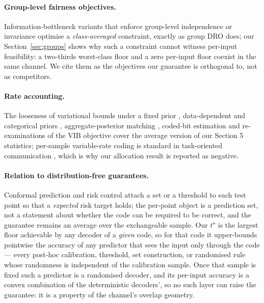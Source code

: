 \documentclass[11pt]{article}
\begin{document}
\paragraph{Group-level fairness objectives.} Information-bottleneck variants that
enforce group-level independence or invariance \citep{xie2024fairib} optimise a
\emph{class-averaged} constraint, exactly as group DRO does; our
Section~\ref{sec:groups} shows why such a constraint cannot witness per-input feasibility: a
two-thirds worst-class floor and a zero per-input floor coexist in the same channel. We cite them
as the objectives our guarantee is orthogonal to, not as competitors.

\paragraph{Rate accounting.} The looseness of variational bounds under a fixed prior
\citep{poole2019}, data-dependent and categorical priors \citep{sefidgaran2025,samaddar2022},
aggregate-posterior matching \cite{saha2023}, coded-bit estimation \citep{townsend2019}
and re-examinations of the VIB objective \citep{revisitvib} cover the average version of our
Section 5 statistics; per-sample variable-rate coding is standard in task-oriented communication
\citep{deshmukh2024,mcdowell2026,adaptq2025}, which is why our allocation result is reported as
negative.

\paragraph{Relation to distribution-free guarantees.} Conformal prediction and risk control
\citep{bates2021} attach a set or a threshold to each test point so that a \emph{expected} risk
target holds; the per-point object is a prediction set, not a statement about whether the code can
be required to be correct, and the guarantee remains an average over the exchangeable sample.
Our $t^\star$ is the largest floor achievable by any decoder of a \emph{given} code, so for that
code it upper-bounds pointwise the accuracy of any predictor that sees the input only through the
code --- every post-hoc calibration, threshold, set construction, or randomised rule whose
randomness is independent of the calibration sample. Once that sample is fixed such a predictor
is a randomised decoder, and its per-input accuracy is a convex combination of the deterministic
decoders', so no such layer can raise the guarantee: it is a property of the channel's overlap
geometry.
\end{document}
